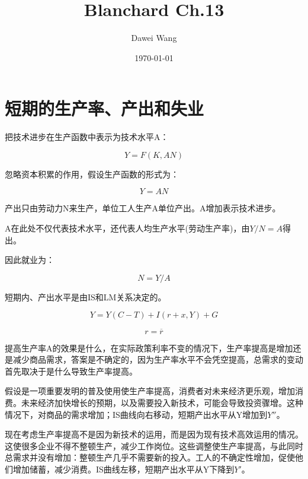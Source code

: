 \documentclass{article}
\title{Blanchard Ch.13}
\author{Dawei Wang}
\date{\today}
\begin{document}
	\maketitle	

\section{短期的生产率、产出和失业}

把技术进步在生产函数中表示为技术水平A：

\[
Y=F(K,AN)
\]

忽略资本积累的作用，假设生产函数的形式为：

\[
Y=AN
\]

产出只由劳动力N来生产，单位工人生产A单位产出。A增加表示技术进步。

A在此处不仅代表技术水平，还代表人均生产水平(劳动生产率)，由$ Y/N=A $得出。

因此就业为：

\[
N=Y/A
\]

短期内、产出水平是由IS和LM关系决定的。

\[
Y=Y(C-T)+I(r+x,Y)+G
\]

\[
r=\overline{r}
\]
	
提高生产率A的效果是什么，在实际政策利率不变的情况下，生产率提高是增加还是减少商品需求，答案是不确定的，因为生产率水平不会凭空提高，总需求的变动首先取决于是什么导致生产率提高。

假设是一项重要发明的普及使用使生产率提高，消费者对未来经济更乐观，增加消费。未来经济加快增长的预期，以及需要投入新技术，可能会导致投资骤增。这种情况下，对商品的需求增加；IS曲线向右移动，短期产出水平从Y增加到$ Y'' $。

\hspace*{\fill}

现在考虑生产率提高不是因为新技术的运用，而是因为现有技术高效运用的情况。这使很多企业不得不整顿生产，减少工作岗位。这些调整使生产率提高，与此同时总需求并没有增加：整顿生产几乎不需要新的投入。工人的不确定性增加，促使他们增加储蓄，减少消费。IS曲线左移，短期产出水平从Y下降到$ Y' $。
\end{document}
